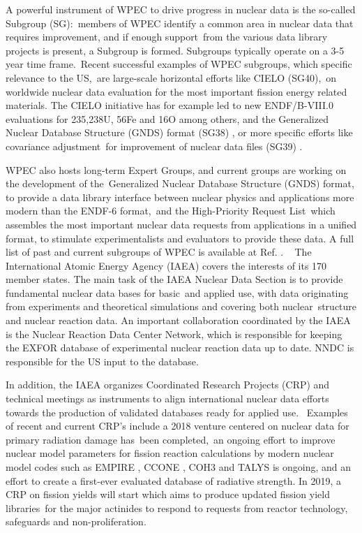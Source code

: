 \documentclass[letterpaper]{ar-1col}
\begin{document}
A powerful instrument of WPEC to drive progress in nuclear data is the so-called Subgroup (SG): members of WPEC identify a common area in nuclear data that requires improvement, and if enough support from the various data library projects is present, a Subgroup is formed.  Subgroups typically operate on a 3-5 year time frame. Recent successful examples of WPEC subgroups, which specific relevance to the US, are large-scale horizontal efforts like CIELO (SG40), on worldwide nuclear data evaluation for the most important fission energy related materials. The CIELO initiative has for example led to new ENDF/B-VIII.0 evaluations for 235,238U, 56Fe and 16O among others, and the Generalized Nuclear Database Structure (GNDS) format (SG38) \cite{SG38}, or more specific efforts like covariance adjustment for improvement of nuclear data files (SG39) \cite{SG39}. 

WPEC also hosts long-term Expert Groups, and current groups are working on the development of the Generalized Nuclear Database Structure (GNDS) format, to provide a data library interface between nuclear physics and applications more modern than the ENDF-6 format, and the High-Priority Request List which assembles the most important nuclear data requests from applications in a unified format, to stimulate experimentalists and evaluators to provide these data. A full list of past and current subgroups of WPEC is available at Ref. \cite{WPEC}.
 
The International Atomic Energy Agency (IAEA) covers the interests of its 170 member states. The main task of the IAEA Nuclear Data Section is to provide fundamental nuclear data bases for basic and applied use, with data originating from experiments and theoretical simulations and covering both nuclear structure and nuclear reaction data.  An important collaboration coordinated by the IAEA is the Nuclear Reaction Data Center Network, which is responsible for keeping the EXFOR database of experimental nuclear reaction data up to date. NNDC is responsible for the US input to the database.  

In addition, the IAEA organizes Coordinated Research Projects (CRP) and technical meetings as instruments to align international nuclear data efforts towards the production of validated databases ready for applied use.  Examples of recent and current CRP's include a 2018 venture centered on nuclear data for primary radiation damage has been completed, an ongoing effort to improve nuclear model parameters for fission reaction calculations by modern nuclear model codes such as EMPIRE \cite{Her07}, CCONE \cite{Iwa16}, COH3 \cite{Kaw10} and TALYS \cite{Kon08} is ongoing, and an effort to create a first-ever evaluated database of radiative strength.  In 2019, a CRP on fission yields will start which aims to produce updated fission yield libraries for the major actinides to respond to requests from reactor technology, safeguards and non-proliferation.
\end{document}
